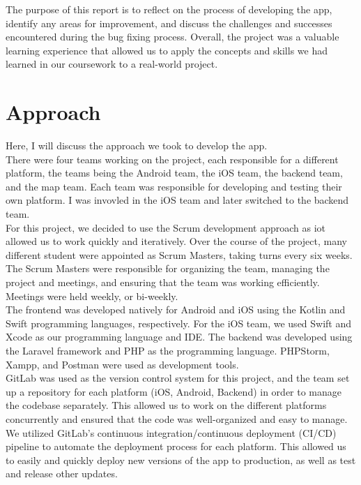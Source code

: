 \documentclass[sf-font,usefira,english]{uulm/sp/article}
\begin{document}
The purpose of this report is to reflect on the process 
of developing the app, identify any areas for improvement, 
and discuss the challenges and successes encountered during the bug fixing process.
Overall, the project was a valuable learning experience that allowed us to 
apply the concepts and skills we had learned in our coursework to a real-world project. \\

\section{Approach}

Here, I will discuss the approach we took to develop the app.\\

There were four teams working on the project, each responsible for a different platform,
the teams being the Android team, the iOS team, the backend team, and the map team.
Each team was responsible for developing and testing their own platform.
I was invovled in the iOS team and later switched to the backend team.\\

For this project, we decided to use the Scrum development approach 
as iot allowed us to work quickly and iteratively.
Over the course of the project, many different student were appointed as Scrum Masters, taking turns every six weeks.
The Scrum Masters were responsible for organizing the team,
managing the project and meetings, and ensuring that the team was working efficiently.
Meetings were held weekly, or bi-weekly.\\

The frontend was developed natively for Android and iOS using the Kotlin and Swift programming languages, respectively.
For the iOS team, we used Swift and Xcode as our programming language and IDE.
The backend was developed using the Laravel framework and PHP as the programming language.
PHPStorm, Xampp, and Postman were used as development tools.\\

GitLab was used as the version control system for this project, 
and the team set up a repository for each platform (iOS, Android, Backend) 
in order to manage the codebase separately. 
This allowed us to work on the different platforms concurrently 
and ensured that the code was well-organized and easy to manage.\\

We utilized GitLab's continuous integration/continuous deployment (CI/CD) 
pipeline to automate the deployment process for each platform. 
This allowed us to easily and quickly deploy new versions of the app to production, 
as well as test and release other updates.\\
\end{document}
